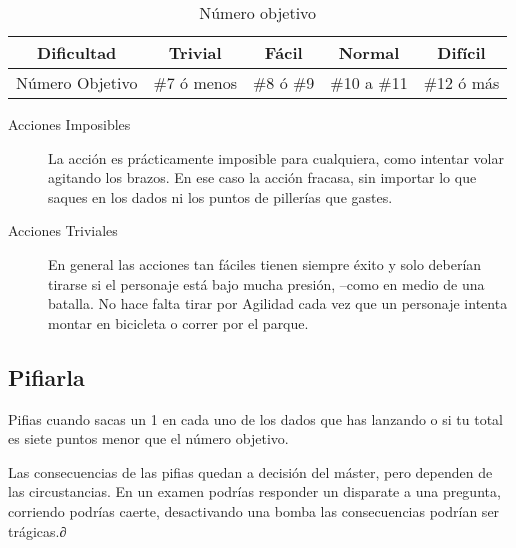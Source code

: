 \begin{table}[h]
\centering
\begin{tabular}{ccccc}
\toprule
Dificultad&Trivial&Fácil&Normal&Difícil\\\midrule
Número Objetivo&\#7 ó menos&\#8 ó \#9&\#10 a \#11&\#12 ó más\\\midrule
\bottomrule
\end{tabular}
\caption{Número objetivo}
\end{table}


\begin{description}
\item[Acciones Imposibles] La acción es prácticamente imposible para cualquiera, como intentar volar agitando los brazos. En ese caso la acción fracasa, sin importar lo que saques en los dados ni los puntos de pillerías que gastes.
\item[Acciones Triviales] En general las acciones tan fáciles tienen siempre éxito y solo deberían tirarse si el personaje está bajo mucha presión, --como en medio de una batalla. No hace falta tirar por Agilidad cada vez que un personaje intenta montar en bicicleta o correr por el parque.
\end{description}

\subsection{Pifiarla}

Pifias cuando sacas un 1 en cada uno de los dados que has lanzando o si tu total es siete puntos menor que el número objetivo.

Las consecuencias de las pifias quedan a decisión del máster, pero dependen de las circustancias. En un examen podrías responder un disparate a una pregunta, corriendo podrías caerte, desactivando una bomba las consecuencias podrían ser trágicas.∂



